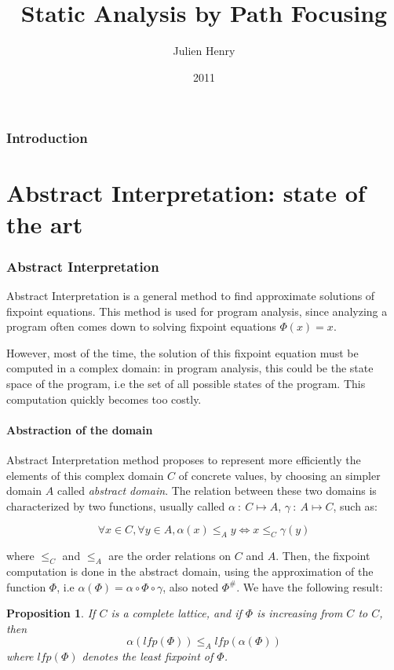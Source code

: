 \documentclass[a4paper,english,titlepage,11pt]{article}
\title{Static Analysis by Path Focusing}
\author{Julien Henry}
\date{2011}
\institute{Grenoble-INP}
\newtheorem{proposition}[theorem]{Proposition}
\begin{document}
  
  \maketitlepage

  \tableofcontents
  
  \newpage


\section*{Introduction} 

\part{Abstract Interpretation: state of the art}

\section{Abstract Interpretation}

Abstract Interpretation \cite{CC77,CousotCousot92-1} is a general method to find approximate solutions of
fixpoint equations. This method is used for program analysis, since analyzing a
program often comes down to solving fixpoint equations $\Phi(x) = x$.

However, most of the time, the solution of this fixpoint equation must be
computed in a complex domain: in program analysis, this could be the state space
of the program, i.e the set of all possible states of the program. This
computation quickly becomes too costly.

\subsection{Abstraction of the domain}

Abstract Interpretation method proposes to represent more efficiently the
elements of this complex domain $C$ of concrete values, by choosing an simpler
domain  $A$ called \emph{abstract domain}. The relation between these two
domains is characterized by two functions, usually called 
$\alpha\ :\ C \mapsto A$, $\gamma \ : \ A \mapsto C$, such as:

$$\forall x \in C, \forall y \in A, \alpha(x) \leq_{A} y \Leftrightarrow x
\leq_{C} \gamma(y) $$

where $\leq_C$ and $\leq_A$ are the order relations on $C$ and $A$. Then, the
fixpoint computation is done in the abstract domain, using the approximation of
the function $\Phi$, i.e $\alpha(\Phi) = \alpha \circ \Phi \circ \gamma$, also
noted $\Phi^\#$.
We have the following result:

\begin{proposition}
If $C$ is a complete lattice, and if $\Phi$ is increasing from $C$ to $C$, then
$$\alpha(lfp(\Phi)) \leq_A lfp(\alpha(\Phi))$$
where $lfp(\Phi)$ denotes the least fixpoint of $\Phi$.
\end{proposition}
\end{document}
